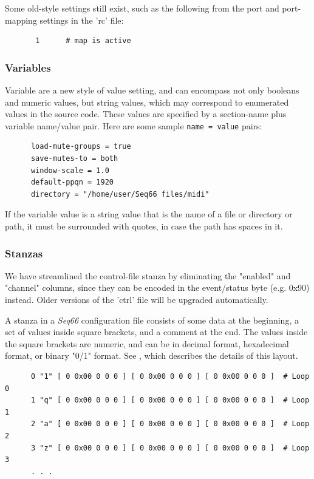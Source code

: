    Some old-style settings still exist, such as the following from
   the port and port-mapping settings in the 'rc' file:

   \begin{verbatim}
       1      # map is active
   \end{verbatim}

\subsubsection{Variables}
\label{subsec:configuration_common_variables}

   Variable are a new style of value setting, and can encompass not only
   booleans and numeric values, but string values, which may correspond to
   enumerated values in the source code.  These values are specified by a
   section-name plus variable name/value pair.  Here are some sample
   \texttt{name = value} pairs:

   \begin{verbatim}
      load-mute-groups = true
      save-mutes-to = both
      window-scale = 1.0
      default-ppqn = 1920
      directory = "/home/user/Seq66 files/midi"
   \end{verbatim}

   If the variable value is a string value that is the name of a file or
   directory or path, it must be surrounded with quotes, in case the path has
   spaces in it.

\subsubsection{Stanzas}
\label{subsec:configuration_common_stanzas}

   We have streamlined the control-file stanza by eliminating the "enabled" and
   "channel" columns, since they can be encoded in the event/status
   byte (e.g. 0x90) instead.  Older versions of the 'ctrl' file will be
   upgraded automatically.

   A stanza in a \textsl{Seq66} configuration file consists of some data at the
   beginning, a set of values inside square brackets, and a comment
   at the end.  The values inside the square brackets are numeric, and can
   be in decimal format, hexadecimal format, or binary "0/1" format.
   See , which describes
   the details of this layout.

   \begin{verbatim}
      0 "1" [ 0 0x00 0 0 0 ] [ 0 0x00 0 0 0 ] [ 0 0x00 0 0 0 ]  # Loop 0
      1 "q" [ 0 0x00 0 0 0 ] [ 0 0x00 0 0 0 ] [ 0 0x00 0 0 0 ]  # Loop 1
      2 "a" [ 0 0x00 0 0 0 ] [ 0 0x00 0 0 0 ] [ 0 0x00 0 0 0 ]  # Loop 2
      3 "z" [ 0 0x00 0 0 0 ] [ 0 0x00 0 0 0 ] [ 0 0x00 0 0 0 ]  # Loop 3
      . . .
   \end{verbatim}

